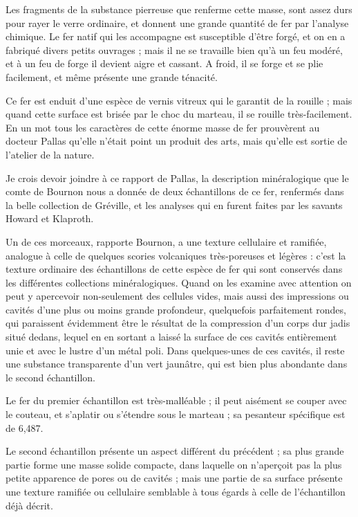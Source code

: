 \documentclass[a4paper, 12pt, oneside, french]{article}
\begin{document}
Les fragments de la substance pierreuse que renferme cette masse, sont assez durs pour rayer le verre ordinaire, et donnent une grande quantité de fer par l'analyse chimique. Le fer natif qui les accompagne est susceptible d'être forgé, et on en a fabriqué divers petits ouvrages ; mais il ne se travaille bien qu'à un feu modéré, et à un feu de forge il devient aigre et cassant. A froid, il se forge et se plie facilement, et même présente une grande ténacité.

Ce fer est enduit d'une espèce de vernis vitreux qui le garantit de la rouille ; mais quand cette surface est brisée par le choc du marteau, il se rouille très-facilement. En un mot tous les caractères de cette énorme masse de fer prouvèrent au docteur Pallas qu'elle n'était point un produit des arts, mais qu'elle est sortie de l'atelier de la nature.

Je crois devoir joindre à ce rapport de Pallas, la description minéralogique que le comte de Bournon nous a donnée de deux échantillons de ce fer, renfermés dans la belle collection de Gréville, et les analyses qui en furent faites par les savants Howard et Klaproth.

Un de ces morceaux, rapporte Bournon, a une texture cellulaire et ramifiée, analogue à celle de quelques scories volcaniques très-poreuses et légères : c'est la texture ordinaire des échantillons de cette espèce de fer qui sont conservés dans les différentes collections minéralogiques. Quand on les examine avec attention on peut y apercevoir non-seulement des cellules vides, mais aussi des impressions ou cavités d'une plus ou moins grande profondeur, quelquefois parfaitement rondes, qui paraissent évidemment être le résultat de la compression d'un corps dur jadis situé dedans, lequel en en sortant a laissé la surface de ces cavités entièrement unie et avec le lustre d'un métal poli. Dans quelques-unes de ces cavités, il reste une substance transparente d'un vert jaunâtre, qui est bien plus abondante dans le second échantillon.

Le fer du premier échantillon est très-malléable ; il peut aisément se couper avec le couteau, et s'aplatir ou s'étendre sous le marteau ; sa pesanteur spécifique est de 6,487.

Le second échantillon présente un aspect différent du précédent ; sa plus grande partie forme une masse solide compacte, dans laquelle on n'aperçoit pas la plus petite apparence de pores ou de cavités ; mais une partie de sa surface présente une texture ramifiée ou cellulaire semblable à tous égards à celle de l'échantillon déjà décrit.
\end{document}
